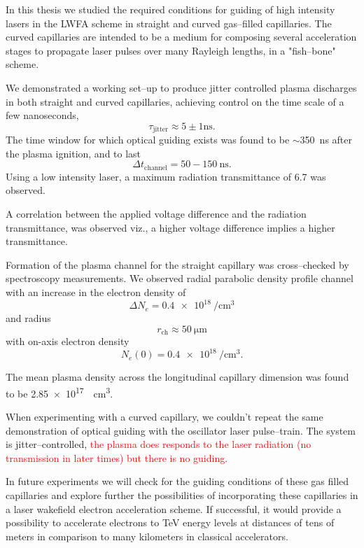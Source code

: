 \documentclass[../main.tex]{subfiles}
\begin{document}
In this thesis we studied the required conditions for guiding of high intensity lasers in the LWFA scheme in straight and curved gas--filled capillaries. The curved capillaries are intended to be a medium for composing several acceleration stages to propagate laser pulses over many Rayleigh lengths, in a "fish--bone" scheme.

We demonstrated a working set--up to produce jitter controlled plasma discharges in both straight and curved capillaries, achieving control on the time scale of a few nanoseconds,
\begin{equation*}
    	\tau_\text{jitter}\approx 5\pm 1\si{\ns}.
\end{equation*}
The time window for which optical guiding exists was found to be $\sim$\SI{350}{\ns} after the plasma ignition, and to last
\begin{equation*}
    \Delta t_\text{channel}=50-150\ \si{\ns}.
\end{equation*}
Using a low intensity laser, a maximum radiation transmittance of 6.7 was observed.

A correlation between the applied voltage difference and the radiation transmittance, was observed viz., a higher voltage difference implies a higher transmittance.

Formation of the plasma channel for the straight capillary was cross--checked by spectroscopy measurements. We observed radial parabolic density profile channel with an increase in the electron density of $$\Delta N_e =\SI{0.4e18}{\per\cubic\cm}$$ and radius
$$r_\text{ch}\approx \SI{50}{\um}$$ with on-axis electron density $$N_e(0)=\SI{0.4e18}{\per\cubic\cm}.$$

The mean plasma density across the longitudinal capillary dimension was found to be \SI{2.85e17}{\per\cubic\cm}.

When experimenting with a curved capillary, we couldn't repeat the same demonstration of optical guiding with the oscillator laser pulse--train. The system is jitter--controlled, \textcolor{red}{the plasma does responds to the laser radiation (no transmission in later times) but there is no guiding.}

In future experiments we will check for the guiding  conditions of these gas filled capillaries and explore further the  possibilities of incorporating these capillaries in a laser wakefield electron acceleration scheme. If successful, it would provide a possibility to accelerate electrons to TeV energy levels at distances of tens of meters in comparison to many kilometers in classical accelerators.


\end{document}
